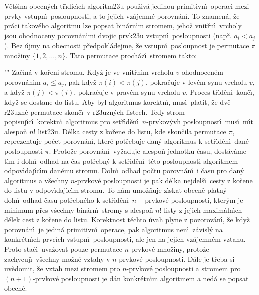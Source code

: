 \documentclass[a4paper,12pt]{article}
\begin{document}
\flushpar V\v et\v sina obecn\'ych t\v r\'\i dic\'\i ch algoritm\accent23u 
pou\v z\'\i v\'a jedinou primitivn\'\i\ operaci mezi prvky vstupn\'\i\ 
posloupnosti, a to jejich vz\'a\-jemn\'e porov\-n\'an\'\i .  
To znamen\'a, \v ze pr\'aci 
takov\'eho algoritmu lze po\-psat 
bin\'arn\'\i m stro\-mem, jeho\v z vnit\v rn\'\i\ vrcholy jsou ohodnoceny 
porovn\'an\'\i mi dvojic prvk\accent23u vstupn\'\i\ posloupnosti 
(nap\v r. $a_i<a_j$). Bez \'ujmy na obecnosti p\v redpokl\'adejme, \v ze 
vstupn\'\i\ posloupnost je permutace $\pi$
mno\v ziny $\{1,2,\dots,n\}$. Tato permutace proch\'az\'\i\ 
stromem takto:
\roster
\item"{}"
Za\v c\'\i n\'a v ko\v reni stromu. Kdy\v z je ve vnit\v rn\'\i m vrcholu $
v$ 
ohodnocen\'em porovn\'an\'\i m $a_i\le a_j$, pak kdy\v z $\pi (i)
<\pi (j)$, 
pokra\v cuje v lev\'em synu vrcholu $v$, a kdy\v z $\pi (j)<\pi (
i)$, 
pokra\v cuje v prav\'em synu vrcholu $v$. Proces 
t\v r\'\i d\v en\'\i\ kon\v c\'\i , kdy\v z se dostane do listu.
\endroster
Aby byl algoritmus korektn\'\i , mus\'\i\ platit, \v ze dv\v e 
r\accent23uzn\'e permutace skon\v c\'\i\ v r\accent23uzn\'ych 
listech.  Tedy strom popisuj\'\i c\'\i\ korektn\'\i\ algoritmus 
pro set\v r\'\i d\v en\'\i\ $n$-prvkov\'yvh posloupnost\'\i\ mus\'\i\ m\'\i t 
alespo\v n $n!$ list\accent23u.  D\'elka cesty z ko\v rene do listu, 
kde skon\v cila permutace $\pi$, reprezentuje po\v cet porovn\'an\'\i , kter\'e pot\v rebuje 
dan\'y algoritmus k set\v r\'\i d\v en\'\i\ dan\'e posloupnosti $
\pi$. Proto\v ze porovn\'an\'\i\ 
vy\v zaduje alespo\v n jednotku \v casu, dost\'av\'ame t\'\i m i doln\'\i\ odhad na 
\v cas pot\v rebn\'y k set\v r\'\i d\v en\'\i\ t\'eto posloupnosti  algoritmem 
odpov\'\i daj\'\i c\'\i m dan\'emu stromu. Doln\'\i\ odhad  po\v ctu 
porovn\'an\'\i\ i \v casu pro dan\'y algoritmus a v\v sechny  
$n$-prvkov\'e posloupnosti je pak d\'elka nejdel\v s\'\i\ cesty z ko\v rene 
do listu v odpov\'\i daj\'\i c\'\i m stromu. To n\'am umo\v z\v nuje 
z\'\i skat obecn\v e platn\'y doln\'\i\ odhad \v casu pot\v rebn\'eho k set\v r\'\i d\v en\'\i\ 
$n-$prvkov\'e posloupnosti, kter\'ym je  
minimum p\v res v\v sechny bin\'arn\'\i\ stromy s alespo\v n $n!$ 
listy z jejich maxim\'aln\'\i ch d\'elek cest z ko\v rene do listu. 
Korekt\-nost t\v echto \'uvah plyne z pozorov\'an\'\i , 
\v ze kdy\v z porovn\'an\'\i\ je jedin\'a primi\-tivn\'\i\ operace, pak 
algoritmus nen\'\i\ z\'avisl\'y na konkr\'etn\'\i ch prvc\'\i ch vstup\-n\'\i\ 
posloupnosti, ale jen na jejich vz\'ajemn\'em vzta\-hu. 
Proto sta\v c\'\i\ uva\v zovat pouze permutace $n$-prvkov\'e mno\v ziny, 
proto\v ze za\-chycuj\'\i\ v\v sechny mo\v zn\'e vztahy v $n$-prvkov\'e 
posloupnosti. D\'a\-le je t\v reba si uv\v edomit, \v ze vztah mezi 
stromem pro $n$-prvkov\'e posloupnosti a stromem pro 
$(n+1)$-prvkov\'e posloupnosti je d\'an konkr\'etn\'\i m algoritmem a 
ned\'a se popsat obecn\v e. 
\medskip
\end{document}

